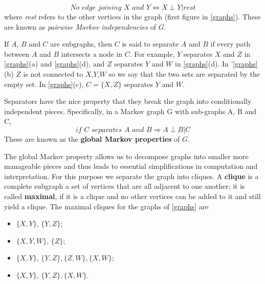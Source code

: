 \documentclass[12pt, letterpaper]{article}
\theoremstyle{definition}
\begin{document}
\begin{equation}
\textit{No edge joining $X$ and $Y$} \Longleftrightarrow  X \perp Y|rest
\end{equation}
where \textit{rest} refers to the other vertices in the graph (first figure in \ref{graphs}). These are known as \textit{pairwise Markov independencies} of $G$.

If $A$, $B$ and $C$ are subgraphs, then $C$ is said to separate $A$ and $B$ if every path between $A$ and $B$ intersects a node in $C$. For example, $Y$ separates $X$ and $Z$ in \ref{graphs}(a) and \ref{graphs}(d), and $Z$ separates $Y$ and $W$ in \ref{graphs}(d). In '\ref{graphs}(b) $Z$ is not connected to $X$,$Y$,$W$ so we say that the two sets are separated by the empty set. In \ref{graphs}(c), $C = \{X,Z\}$ separates $Y$ and $W$.

Separators have the nice property that they break the graph into conditionally independent pieces. Specifically, in a Markov graph G with sub-graphs A, B and C,
\begin{equation}
\textit{if $C$ separates $A$ and $B$} \Rightarrow A\perp B|C
\end{equation}
These are known as the \textbf{global Markov properties} of $G$.

The global Markov property allows us to decompose graphs into smaller more manageable pieces and thus leads to essential simplifications in computation and interpretation. For this purpose we separate the graph into cliques. A \textbf{clique} is a complete subgraph a set of vertices that are all adjacent to one another; it is called \textbf{maximal}, if it is a clique and no other vertices can be added to it and still yield a clique. The maximal cliques for the graphs of \ref{graphs} are
\begin{itemize}
\item $\{X, Y\}$, $\{Y, Z\}$;
\item $\{X, Y, W\}$, $\{Z\}$;
\item $\{X, Y\}$, $\{Y, Z\}, \{Z, W\},\{X, W\}$;
\item $\{X, Y\}$, $\{Y, Z\}, \{X, W\}$.
\end{itemize}
\end{document}
